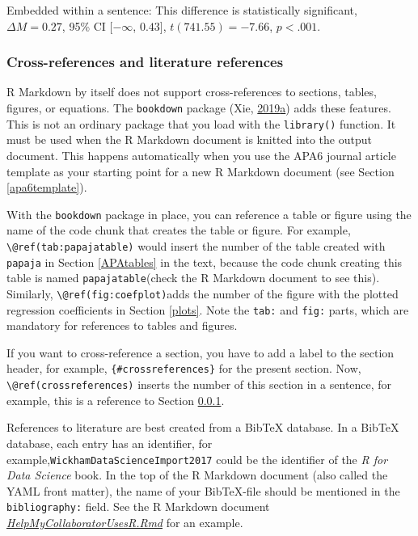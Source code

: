 \documentclass[doc,floatsintext]{apa6}
\newenvironment{Shaded}{\begin{snugshade}}{\end{snugshade}}
\newcommand{\DataTypeTok}[1]{\textcolor[rgb]{0.13,0.29,0.53}{#1}}
\newcommand{\StringTok}[1]{\textcolor[rgb]{0.31,0.60,0.02}{#1}}
\begin{document}
\begin{Shaded}
\end{Shaded}

Embedded within a sentence: This difference is statistically
significant, \(\Delta M = 0.27\), 95\% CI \([-\infty\), \(0.43]\),
\(t(741.55) = -7.66\), \(p < .001\).

\subsubsection{Cross-references and literature
references}\label{crossreferences}

R Markdown by itself does not support cross-references to sections,
tables, figures, or equations. The \texttt{bookdown} package (Xie,
\protect\hyperlink{ref-R-bookdown}{2019}\protect\hyperlink{ref-R-bookdown}{a})
adds these features. This is not an ordinary package that you load with
the \texttt{library()} function. It must be used when the R Markdown
document is knitted into the output document. This happens automatically
when you use the APA6 journal article template as your starting point
for a new R Markdown document (see Section \ref{apa6template}).

With the \texttt{bookdown} package in place, you can reference a table
or figure using the name of the code chunk that creates the table or
figure. For example, \texttt{\textbackslash{}@ref(tab:papajatable)}
would insert the number of the table created with \texttt{papaja} in
Section \ref{APAtables} in the text, because the code chunk creating
this table is named \texttt{papajatable}(check the R Markdown document
to see this). Similarly, \texttt{\textbackslash{}@ref(fig:coefplot)}adds
the number of the figure with the plotted regression coefficients in
Section \ref{plots}. Note the \texttt{tab:} and \texttt{fig:} parts,
which are mandatory for references to tables and figures.

If you want to cross-reference a section, you have to add a label to the
section header, for example, \texttt{\{\#crossreferences\}} for the
present section. Now, \texttt{\textbackslash{}@ref(crossreferences)}
inserts the number of this section in a sentence, for example, this is a
reference to Section \ref{crossreferences}.

References to literature are best created from a BibTeX database. In a
BibTeX database, each entry has an identifier, for
example,\texttt{WickhamDataScienceImport2017} could be the identifier of
the \emph{R for Data Science} book. In the top of the R Markdown
document (also called the YAML front matter), the name of your
BibTeX-file should be mentioned in the \texttt{bibliography:} field. See
the R Markdown document
\href{https://wdenooy.github.io/Switch2R/HelpMyCollaboratorUsesR.Rmd}{\emph{HelpMyCollaboratorUsesR.Rmd}}
for an example.
\end{document}

